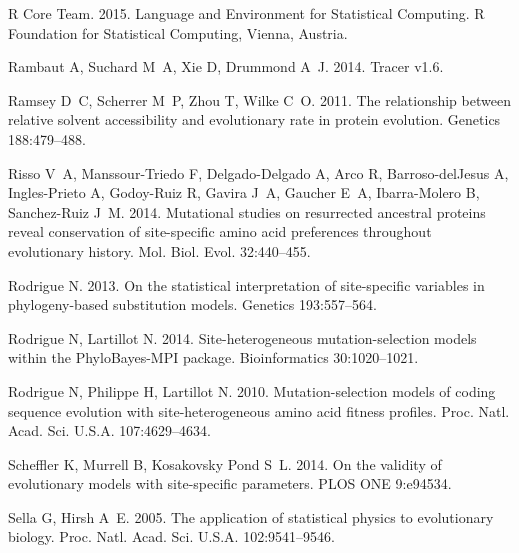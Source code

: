 \documentclass[11pt]{article}
\begin{document}
\begin{thebibliography}{38}
{R Core Team}. 2015.
 Language and Environment for Statistical Computing.
\newblock R Foundation for Statistical Computing, Vienna, Austria.

Rambaut A, Suchard M~A, Xie D, Drummond A~J. 2014.
\newblock Tracer v1.6.

Ramsey D~C, Scherrer M~P, Zhou T, Wilke C~O. 2011.
\newblock The relationship between relative solvent accessibility and
  evolutionary rate in protein evolution.
\newblock Genetics 188:479--488.

Risso V~A, {Manssour-Triedo} F, {Delgado-Delgado} A, Arco R, {Barroso-delJesus}
  A, {Ingles-Prieto} A, {Godoy-Ruiz} R, Gavira J~A, Gaucher E~A,
  {Ibarra-Molero} B, {Sanchez-Ruiz} J~M. 2014.
\newblock Mutational studies on resurrected ancestral proteins reveal
  conservation of site-specific amino acid preferences throughout evolutionary
  history.
\newblock Mol. Biol. Evol. 32:440--455.

Rodrigue N. 2013.
\newblock On the statistical interpretation of site-specific variables in
  phylogeny-based substitution models.
\newblock Genetics 193:557--564.

Rodrigue N, Lartillot N. 2014.
\newblock Site-heterogeneous mutation-selection models within the
  {PhyloBayes-MPI} package.
\newblock Bioinformatics 30:1020--1021.

Rodrigue N, Philippe H, Lartillot N. 2010.
\newblock Mutation-selection models of coding sequence evolution with
  site-heterogeneous amino acid fitness profiles.
\newblock Proc. Natl. Acad. Sci. U.S.A. 107:4629--4634.

Scheffler K, Murrell B, {Kosakovsky Pond} S~L. 2014.
\newblock On the validity of evolutionary models with site-specific parameters.
\newblock PLOS ONE 9:e94534.

Sella G, Hirsh A~E. 2005.
\newblock The application of statistical physics to evolutionary biology.
\newblock Proc. Natl. Acad. Sci. U.S.A. 102:9541--9546.


\end{thebibliography}
\end{document}
